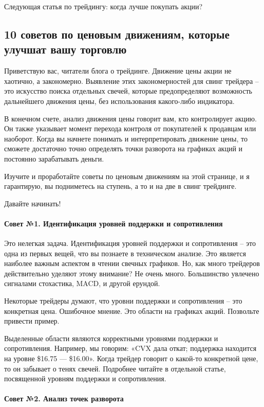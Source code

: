 \documentclass{book}
\begin{document}
Следующая статья по трейдингу: когда лучше покупать акции?

\subsection{10 советов по ценовым движениям, которые улучшат вашу
  торговлю}

Приветствую вас, читатели блога о трейдинге. Движение цены акции не хаотично, а закономерно. Выявление этих закономерностей для свинг трейдера – это искусство поиска отдельных свечей, которые предопределяют возможность дальнейшего движения цены, без использования какого-либо индикатора.

В конечном счете, анализ движения цены говорит вам, кто контролирует акцию. Он также указывает момент перехода контроля от покупателей к продавцам или наоборот. Когда вы начнете понимать и интерпретировать движение цены, то сможете достаточно точно определять точки разворота на графиках акций и постоянно зарабатывать деньги.

Изучите и проработайте советы по ценовым движениям на этой странице, и я гарантирую, вы подниметесь на ступень, а то и на две в свинг трейдинге.

Давайте начинать!

\paragraph{Совет №1. Идентификация уровней поддержки и
  сопротивления}

Это нелегкая задача. Идентификация уровней поддержки и сопротивления – это одна из первых вещей, что вы познаете в техническом анализе. Это является наиболее важным аспектом в чтении свечных графиков. Но, как много трейдеров действительно уделяют этому внимание? Не очень много. Большинство увлечено сигналами стохастика, MACD, и другой ерундой.

Некоторые трейдеры думают, что уровни поддержки и сопротивления – это конкретная цена. Ошибочное мнение. Это области на графиках акций. Позвольте привести пример.

Выделенные области являются корректными уровнями поддержки и
сопротивления. Например, мы говорим: «CVX дала откат; поддержка
находится на уровне \$16.75 — \$16.00». Когда трейдер говорит о
какой-то конкретной цене, то он забывает о тенях свечей. Подробнее
читайте в отдельной статье, посвященной уровням поддержки и
сопротивления.

\paragraph{Совет №2. Анализ точек разворота}
\end{document}
